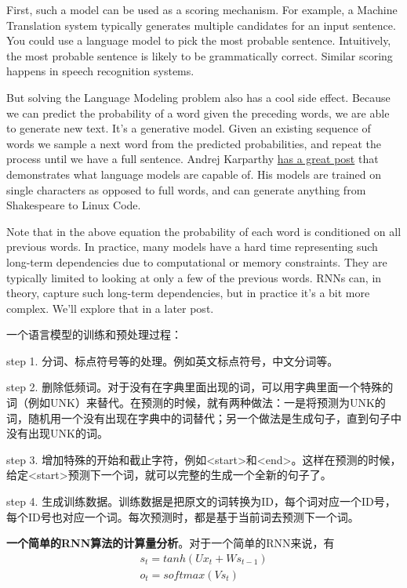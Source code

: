 \documentclass[10pt,a4paper]{ctexbook}
\begin{document}
First, such a model can be used as a scoring mechanism. For example, a Machine Translation system typically generates multiple candidates for an input sentence. You could use a language model to pick the most probable sentence. Intuitively, the most probable sentence is likely to be grammatically correct. Similar scoring happens in speech recognition systems.

But solving the Language Modeling problem also has a cool side effect. Because we can predict the probability of a word given the preceding words, we are able to generate new text. It's a generative model. Given an existing sequence of words we sample a next word from the predicted probabilities, and repeat the process until we have a full sentence. Andrej Karparthy \href{http://karpathy.github.io/2015/05/21/rnn-effectiveness/}{has a great post} that demonstrates what language models are capable of. His models are trained on single characters as opposed to full words, and can generate anything from Shakespeare to Linux Code.

Note that in the above equation the probability of each word is conditioned on all previous words. In practice, many models have a hard time representing such long-term dependencies due to computational or memory constraints. They are typically limited to looking at only a few of the previous words. RNNs can, in theory, capture such long-term dependencies, but in practice it's a bit more complex. We'll explore that in a later post.

一个语言模型的训练和预处理过程：

step 1. 分词、标点符号等的处理。例如英文标点符号，中文分词等。

step 2. 删除低频词。对于没有在字典里面出现的词，可以用字典里面一个特殊的词（例如UNK）来替代。在预测的时候，就有两种做法：一是将预测为UNK的词，随机用一个没有出现在字典中的词替代；另一个做法是生成句子，直到句子中没有出现UNK的词。

step 3. 增加特殊的开始和截止字符，例如<start>和<end>。这样在预测的时候，给定<start>预测下一个词，就可以完整的生成一个全新的句子了。

step 4. 生成训练数据。训练数据是把原文的词转换为ID，每个词对应一个ID号，每个ID号也对应一个词。每次预测时，都是基于当前词去预测下一个词。


\textbf{一个简单的RNN算法的计算量分析}。对于一个简单的RNN来说，有
\[
\begin{aligned}
	s_{t}=tanh(Ux_{t}+Ws_{t-1}) \\
	o_{t}=softmax(Vs_{t})
\end{aligned}
\]
\end{document}
